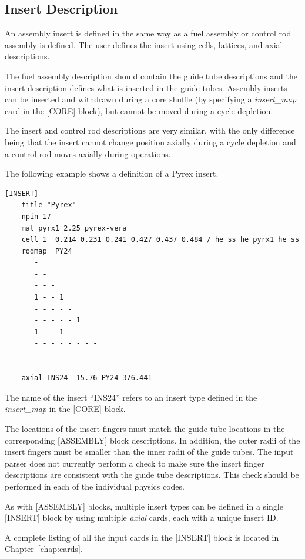 \subsection{Insert Description}
An assembly insert is defined in the same way as a fuel assembly or control rod assembly is defined.
The user defines the insert using cells, lattices, and axial descriptions.

The fuel assembly description should contain the guide tube descriptions and the insert description
defines what is inserted in the guide tubes.  Assembly inserts can be inserted and withdrawn
during a core shuffle (by specifying a {\it insert\_map} card in the [CORE] block),
but cannot be moved during a cycle depletion.

The insert and control rod descriptions are very similar, with the only difference being that the
insert cannot change position axially during a cycle depletion and a control rod moves axially
during operations.

The following example shows a definition of a Pyrex insert.

\begin{Verbatim}[fontsize=\small]
[INSERT]
    title "Pyrex"
    npin 17
    mat pyrx1 2.25 pyrex-vera
    cell 1  0.214 0.231 0.241 0.427 0.437 0.484 / he ss he pyrx1 he ss
    rodmap  PY24
       -
       - -
       - - -
       1 - - 1
       - - - - -
       - - - - - 1
       1 - - 1 - - -
       - - - - - - - -
       - - - - - - - - -

    axial INS24  15.76 PY24 376.441
\end{Verbatim}

The name of the insert ``INS24'' refers to an insert type defined in the
{\it insert\_map} in the [CORE] block.

The locations of the insert fingers must match the guide tube locations in the
corresponding [ASSEMBLY] block descriptions.  In addition, the outer radii of the insert
fingers must be smaller than the inner radii of the guide tubes.
The input parser does not currently perform a check to make sure the insert finger
descriptions are consistent with the guide tube descriptions.
This check should be performed in each of the individual physics codes.

As with [ASSEMBLY] blocks, multiple insert types can be defined in a single [INSERT]
block by using multiple {\it axial} cards, each with a unique insert ID.

A complete listing of all the input cards in the [INSERT] block is located in Chapter~\ref{chap:cards}.

